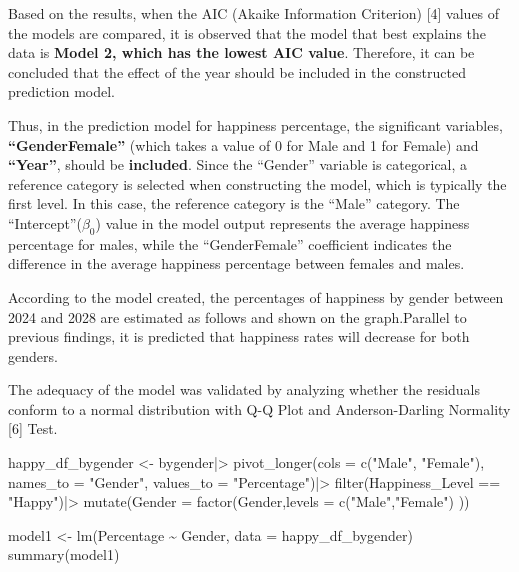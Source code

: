 \documentclass[
  11pt,
  a4paper,
  DIV=11,
  numbers=noendperiod]{scrartcl}
\newenvironment{Shaded}{\begin{snugshade}}{\end{snugshade}}
\newcommand{\AttributeTok}[1]{\textcolor[rgb]{0.40,0.45,0.13}{#1}}
\newcommand{\FunctionTok}[1]{\textcolor[rgb]{0.28,0.35,0.67}{#1}}
\newcommand{\NormalTok}[1]{\textcolor[rgb]{0.00,0.23,0.31}{#1}}
\newcommand{\OtherTok}[1]{\textcolor[rgb]{0.00,0.23,0.31}{#1}}
\newcommand{\SpecialCharTok}[1]{\textcolor[rgb]{0.37,0.37,0.37}{#1}}
\newcommand{\StringTok}[1]{\textcolor[rgb]{0.13,0.47,0.30}{#1}}
\begin{document}
Based on the results, when the AIC (Akaike Information Criterion)
{[}4{]} values of the models are compared, it is observed that the model
that best explains the data is {\textbf{Model 2, which has the lowest
AIC value}}. Therefore, it can be concluded that the effect of the year
should be included in the constructed prediction model.

Thus, in the prediction model for happiness percentage, the significant
variables, {\textbf{``GenderFemale''}} (which takes a value of 0 for
Male and 1 for Female) and {\textbf{``Year''}}, should be
{\textbf{included}}. Since the ``Gender'' variable is categorical, a
reference category is selected when constructing the model, which is
typically the first level. In this case, the reference category is the
``Male'' category. The ``Intercept''(\(\beta_0\)) value in the model
output represents the average happiness percentage for males, while the
``GenderFemale'' coefficient indicates the difference in the average
happiness percentage between females and males.

According to the model created, the percentages of happiness by gender
between 2024 and 2028 are estimated as follows and shown on the
graph.Parallel to previous findings, it is predicted that happiness
rates will decrease for both genders.

The adequacy of the model was validated by analyzing whether the
residuals conform to a normal distribution with Q-Q Plot and
Anderson-Darling Normality {[}6{]} Test.

\begin{Shaded}
\begin{Highlighting}[]
\NormalTok{happy\_df\_bygender  }\OtherTok{\textless{}{-}}\NormalTok{ bygender}\SpecialCharTok{|\textgreater{}}
  \FunctionTok{pivot\_longer}\NormalTok{(}\AttributeTok{cols =} \FunctionTok{c}\NormalTok{(}\StringTok{"Male"}\NormalTok{, }\StringTok{"Female"}\NormalTok{), }
               \AttributeTok{names\_to =} \StringTok{"Gender"}\NormalTok{, }
               \AttributeTok{values\_to =} \StringTok{"Percentage"}\NormalTok{)}\SpecialCharTok{|\textgreater{}}
  \FunctionTok{filter}\NormalTok{(Happiness\_Level }\SpecialCharTok{==} \StringTok{"Happy"}\NormalTok{)}\SpecialCharTok{|\textgreater{}}
\FunctionTok{mutate}\NormalTok{(}\AttributeTok{Gender =} \FunctionTok{factor}\NormalTok{(Gender,}\AttributeTok{levels =} \FunctionTok{c}\NormalTok{(}\StringTok{"Male"}\NormalTok{,}\StringTok{"Female"}\NormalTok{)}
\NormalTok{))}

\NormalTok{model1 }\OtherTok{\textless{}{-}} \FunctionTok{lm}\NormalTok{(Percentage }\SpecialCharTok{\textasciitilde{}}\NormalTok{ Gender, }\AttributeTok{data =}\NormalTok{ happy\_df\_bygender)}
\FunctionTok{summary}\NormalTok{(model1)}
\end{Highlighting}
\end{Shaded}
\end{document}
